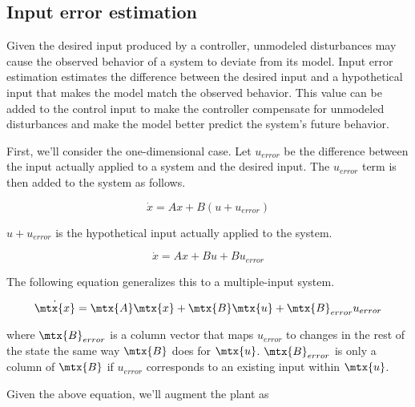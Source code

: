 \subsection{Input error estimation}
\label{subsec:input_error_estimation}

Given the desired \gls{input} produced by a \gls{controller}, unmodeled
\glspl{disturbance} may cause the observed behavior of a \gls{system} to deviate
from its \gls{model}. Input error estimation estimates the difference between
the desired \gls{input} and a hypothetical \gls{input} that makes the
\gls{model} match the observed behavior. This value can be added to the
\gls{control input} to make the \gls{controller} compensate for unmodeled
\glspl{disturbance} and make the \gls{model} better predict the \gls{system}'s
future behavior.

First, we'll consider the one-dimensional case. Let $u_{error}$ be the
difference between the \gls{input} actually applied to a \gls{system} and the
desired \gls{input}. The $u_{error}$ term is then added to the \gls{system} as
follows.

\begin{equation*}
  \dot{x} = Ax + B\left(u + u_{error}\right)
\end{equation*}

$u + u_{error}$ is the hypothetical \gls{input} actually applied to the
\gls{system}.

\begin{equation*}
  \dot{x} = Ax + Bu + Bu_{error}
\end{equation*}

The following equation generalizes this to a multiple-input \gls{system}.

\begin{equation*}
  \dot{\mtx{x}} = \mtx{A}\mtx{x} + \mtx{B}\mtx{u} + \mtx{B}_{error}u_{error}
\end{equation*}

where $\mtx{B}_{error}$ is a column vector that maps $u_{error}$ to changes in
the rest of the \gls{state} the same way $\mtx{B}$ does for $\mtx{u}$.
$\mtx{B}_{error}$ is only a column of $\mtx{B}$ if $u_{error}$ corresponds to an
existing \gls{input} within $\mtx{u}$.

Given the above equation, we'll augment the \gls{plant} as


